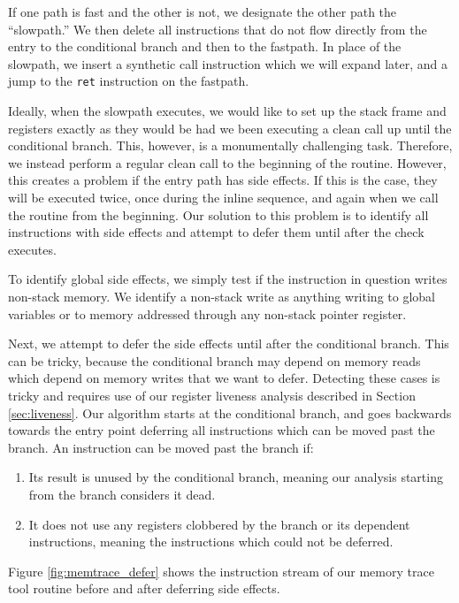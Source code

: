 If one path is fast and the other is not, we designate the other path the
``slowpath.''  We then delete all instructions that do not flow directly from
the entry to the conditional branch and then to the fastpath.  In place of the
slowpath, we insert a synthetic call instruction which we will expand later, and
a jump to the {\tt ret} instruction on the fastpath.

Ideally, when the slowpath executes, we would like to set up the stack frame and
registers exactly as they would be had we been executing a clean call up until
the conditional branch.  This, however, is a monumentally challenging task.
Therefore, we instead perform a regular clean call to the beginning of the
routine.  However, this creates a problem if the entry path has side effects.
If this is the case, they will be executed twice, once during the inline
sequence, and again when we call the routine from the beginning.  Our solution
to this problem is to identify all instructions with side effects and attempt to
defer them until after the check executes.

To identify global side effects, we simply test if the instruction in question
writes non-stack memory.  We identify a non-stack write as anything writing to
global variables or to memory addressed through any non-stack pointer register.

Next, we attempt to defer the side effects until after the conditional branch.
This can be tricky, because the conditional branch may depend on memory reads
which depend on memory writes that we want to defer.  Detecting these cases is
tricky and requires use of our register liveness analysis described in Section
\ref{sec:liveness}.  Our algorithm starts at the conditional branch, and goes
backwards towards the entry point deferring all instructions which can be moved
past the branch.  An instruction can be moved past the branch if:

\begin{enumerate}
\item Its result is unused by the conditional branch, meaning our analysis
starting from the branch considers it dead.
\item It does not use any registers clobbered by the branch or its dependent
instructions, meaning the instructions which could not be deferred.
\end{enumerate}

Figure \ref{fig:memtrace_defer} shows the instruction stream of our memory trace
tool routine before and after deferring side effects.


